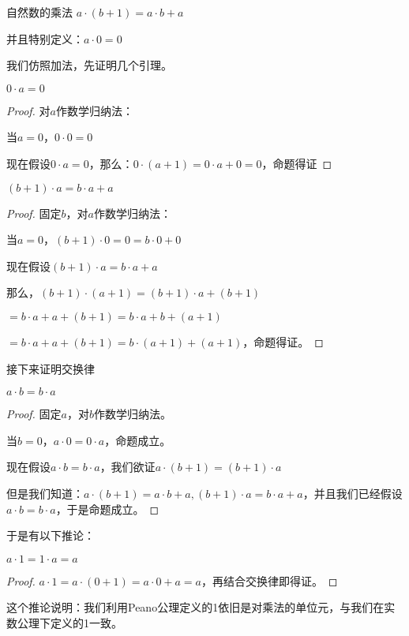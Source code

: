 \documentclass[12pt, a4paper, oneside, UTF8]{ctexbook}
\begin{document}
\begin{para}{0}
\begin{defn}{自然数的乘法}
						$a \cdot (b+1) = a\cdot b + a$
						
						并且特别定义：$a \cdot 0 = 0$
					\end{defn}
					我们仿照加法，先证明几个引理。
					\begin{lemma}{}{}
						$0 \cdot a = 0$
					\end{lemma}
					\begin{proof}
						对$a$作数学归纳法：
						
						当$a=0$，$0 \cdot 0 = 0$
						
						现在假设$0 \cdot a = 0$，那么：$0 \cdot (a+1) = 0\cdot a + 0=0$，命题得证
					\end{proof}
					\begin{lemma}{}{}
						$(b+1)\cdot a = b\cdot a+a$
					\end{lemma}
					\begin{proof}
						固定$b$，对$a$作数学归纳法：
						
						当$a=0$，$(b+1)\cdot 0 = 0 = b\cdot 0+0$
						
						现在假设$(b+1)\cdot a = b\cdot a+a$
						
						那么，$(b+1)\cdot (a+1)=(b+1)\cdot a+(b+1)$
						
						$=b\cdot a+a+(b+1)=b\cdot a+b+(a+1)$
						
						$=b\cdot a + a + (b+1)=b\cdot (a+1)+(a+1)$，命题得证。
					\end{proof}
					接下来证明交换律
					\begin{proposition}{}{}
						$a\cdot b = b\cdot a$
					\end{proposition}
					\begin{proof}
						固定$a$，对$b$作数学归纳法。
						
						当$b=0$，$a \cdot 0 = 0 \cdot a$，命题成立。
						
						现在假设$a\cdot b = b\cdot a$，我们欲证$a\cdot (b+1)=(b+1)\cdot a$
						
						但是我们知道：$a\cdot (b+1)=a\cdot b+a,(b+1)\cdot a = b\cdot a+a$，并且我们已经假设$a\cdot b=b\cdot a$，于是命题成立。
					\end{proof}
					于是有以下推论：
					\begin{corollary}{}{}
						$a\cdot 1 = 1\cdot a = a$
					\end{corollary}
					\begin{proof}
						$a\cdot 1 = a\cdot (0+1)=a\cdot 0+a=a$，再结合交换律即得证。
					\end{proof}
					这个推论说明：我们利用Peano公理定义的1依旧是对乘法的单位元，与我们在实数公理下定义的1一致。
					

\end{para}
\end{document}

